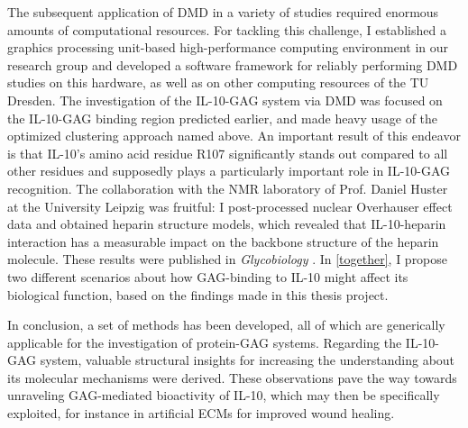 The subsequent application of DMD in a variety of studies required enormous
amounts of computational resources. For tackling this challenge, I established a
graphics processing unit-based high-performance computing environment in our
research group and developed a software framework for reliably performing DMD
studies on this hardware, as well as on other computing resources of the TU
Dresden. The investigation of the IL-10-GAG system via DMD was focused on the
IL-10-GAG binding region predicted earlier, and made heavy usage of the
optimized clustering approach named above. An important result of this endeavor
is that IL-10's amino acid residue R107 significantly stands out compared to all
other residues and supposedly plays a particularly important role in IL-10-GAG
recognition. The collaboration with the NMR laboratory of Prof. Daniel Huster at
the University Leipzig was fruitful: I post-processed nuclear Overhauser effect
data and obtained heparin structure models, which revealed that IL-10-heparin
interaction has a measurable impact on the backbone structure of the heparin
molecule. These results were published in \textit{Glycobiology}
\cite{kuenze_gehrcke_2014}. In \cref{together}, I propose two different
scenarios about how GAG-binding to IL-10 might affect its biological function,
based on the findings made in this thesis project.

In conclusion, a set of methods has been developed, all of which are generically
applicable for the investigation of protein-GAG systems. Regarding the IL-10-GAG
system, valuable structural insights for increasing the understanding about its
molecular mechanisms were derived. These observations pave the way towards
unraveling GAG-mediated bioactivity of IL-10, which may then be specifically
exploited, for instance in artificial ECMs for improved wound healing.
